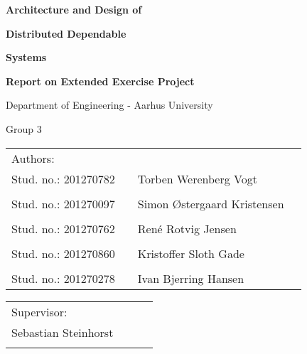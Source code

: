 
\centerline{\Huge\bfseries\color{ThemeColor} Architecture and Design of}
\vspace{0.5em}
\centerline{\Huge\bfseries\color{ThemeColor} Distributed Dependable}
\vspace{0.5em}
\centerline{\Huge\bfseries\color{ThemeColor} Systems}

\vspace{2em}
\centerline{\Large\bfseries\color{BlackColor} Report on Extended Exercise Project}



\vspace{5em}
\centerline{\large\bfseries\color{BlackColor}}
\centerline{\large\color{BlackColor}Department of Engineering - Aarhus University}

\vspace{0.5em}
\centerline{\large\color{BlackColor} Group 3}

\vspace{15em}

\begin{center}
   \begin{tabular}{ l p{3cm} l l }
   	Authors: &&& \\
   Stud. no.: 201270782 && Torben Werenberg Vogt & \\\hline
   & & \\
   Stud. no.: 201270097 && Simon Østergaard Kristensen & \\\hline
   & & \\
   Stud. no.: 201270762 && René Rotvig Jensen & \\\hline
   & & \\
   Stud. no.: 201270860 && Kristoffer Sloth Gade & \\\hline
   & & \\
   Stud. no.: 201270278 &&  Ivan Bjerring Hansen & \\\hline
   \end{tabular}
\end{center}

\vspace{3em}
\begin{center}
	\begin{tabular}{ l p{8cm} l l }
		Supervisor: &&& \\
		Sebastian Steinhorst &&& \\\hline
		& & \\
		\end{tabular}
		\end{center}
\thispagestyle{empty} %
\restoregeometry

